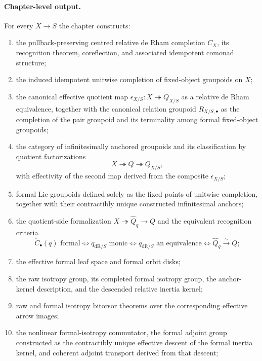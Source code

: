 \paragraph{Chapter-level output.}
For every $X\to S$ the chapter constructs:
\begin{enumerate}
    \item the pullback-preserving centred relative de Rham completion
    $C_X$, its recognition theorem, coreflection, and associated idempotent
    comonad structure;
    \item the induced idempotent unitwise completion of fixed-object
    groupoids on $X$;
    \item the canonical effective quotient map
    $\epsilon_{X/S}:X\twoheadrightarrow Q_{X/S}$ as a relative de Rham
    equivalence, together with the canonical relation groupoid
    $R_{X/S,\bullet}$ as the completion of the pair groupoid and its
    terminality among formal fixed-object groupoids;
    \item the category of infinitesimally anchored groupoids and its
    classification by quotient factorizations
    \[
        X\twoheadrightarrow Q\twoheadrightarrow Q_{X/S},
    \]
    with effectivity of the second map derived from the composite
    $\epsilon_{X/S}$;
    \item formal Lie groupoids defined solely as the fixed points of unitwise
    completion, together with their contractibly unique constructed
    infinitesimal anchors;
    \item the quotient-side formalization
    $X\twoheadrightarrow\widehat Q_q\to Q$ and the equivalent recognition
    criteria
    \[
        \check C_\bullet(q)\text{ formal}
        \Longleftrightarrow
        q_{\mathrm{dR}/S}\text{ monic}
        \Longleftrightarrow
        q_{\mathrm{dR}/S}\text{ an equivalence}
        \Longleftrightarrow
        \widehat Q_q\xrightarrow{\sim}Q;
    \]
    \item the effective formal leaf space and formal orbit disks;
    \item the raw isotropy group, its completed formal isotropy group, the
    anchor-kernel description, and the descended relative inertia kernel;
    \item raw and formal isotropy bitorsor theorems over the corresponding
    effective arrow images;
    \item the nonlinear formal-isotropy commutator, the formal adjoint group
    constructed as the contractibly unique effective descent of the formal
    inertia kernel, and coherent adjoint transport derived from that descent;

\end{enumerate}
